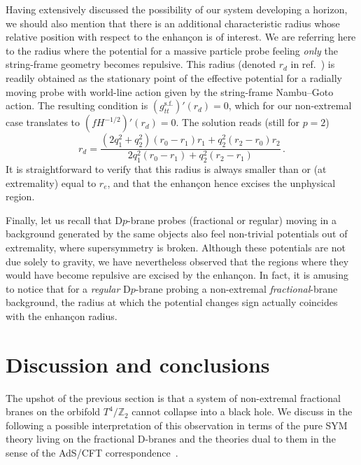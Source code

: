 \documentclass[a4paper,11pt]{article}
\newcommand{\ZZ}{\mathbb{Z}}  \newcommand{\Zint}{\mathbb{Z}}
\begin{document}
Having extensively discussed the possibility of our system developing a
horizon, we should also mention that there is an additional characteristic
radius whose relative position with respect to the enhan\c{c}on is of
interest. We are referring here to the radius where the potential for a
massive particle probe feeling \emph{only} the string-frame geometry becomes
repulsive. This radius (denoted $r_d$ in ref.~\cite{Johnson:2001wm}) is
readily obtained as the stationary point of the effective potential for
a radially moving probe with world-line action given by the string-frame
Nambu--Goto action. The resulting condition is
$(g_{tt}^{\mathrm{s.f.}})'(r_d)=0$, which for our non-extremal case
translates to $(f H^{-1/2})'(r_d)=0$. The solution reads (still for $p=2$)
\begin{equation}
r_d = \frac{(2q_1^2+q_2^2)(r_0-r_1)r_1 + q_2^2(r_2-r_0)r_2}{2q_1^2
(r_0-r_1)+q_2^2(r_2-r_1)} \,.
\end{equation}
It is straightforward to verify that this radius is always smaller than
or (at extremality) equal to $r_e$, and that the enhan\c{c}on hence excises
the unphysical region.

Finally, let us recall that D$p$-brane probes (fractional or regular)
moving in a background generated by the same objects also feel non-trivial
potentials out of extremality, where supersymmetry is broken. Although
these potentials are not due solely to gravity, we have nevertheless
observed that the regions where they would have become repulsive are excised
by the enhan\c{c}on. In fact, it is amusing to notice that for a
\emph{regular} D$p$-brane probing a non-extremal \emph{fractional}-brane
background, the radius at which the potential changes sign actually
coincides with the enhan\c{c}on radius.



\vspace{1ex}
\section{Discussion and conclusions}
\label{disc}

The upshot of the previous section is that a system of non-extremal
fractional branes on the orbifold $T^4\!/\ZZ_2$ cannot collapse into a
black hole. We discuss in the following a possible interpretation of
this observation in terms of the pure SYM theory living on the fractional
D-branes and the theories dual to them in the sense of the AdS/CFT
correspondence~\cite{Maldacena:1997re,Gubser:1998bc,Witten:1998qj}.
\end{document}
